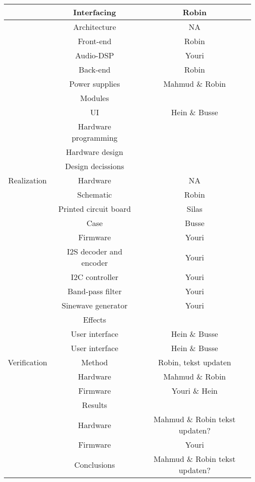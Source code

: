 \begin{justify}
\begin{table}[!h]
\begin{tabular}{|c|c|c|}
							& Interfacing					& Robin				\\ \hline
							& Architecture					& NA				\\ \hline
							& Front-end						& Robin				\\ \hline
							& Audio-DSP						& Youri				\\ \hline
							& Back-end						& Robin				\\ \hline
							& Power supplies				& Mahmud \& Robin	\\ \hline
							& Modules						& 					\\ \hline
							& UI							& Hein \& Busse		\\ \hline
							& Hardware programming			& 					\\ \hline
							& Hardware design				& 					\\ \hline
							& Design decissions				& 					\\ \hline
Realization					& Hardware						& NA				\\ \hline
							& Schematic						& Robin				\\ \hline
							& Printed circuit board			& Silas				\\ \hline
							& Case							& Busse				\\ \hline
							& Firmware						& Youri				\\ \hline
							& I2S decoder and encoder		& Youri				\\ \hline
							& I2C controller				& Youri				\\ \hline
							& Band-pass filter				& Youri				\\ \hline
							& Sinewave generator			& Youri				\\ \hline
							& Effects						& 					\\ \hline
							& User interface				& Hein \& Busse		\\ \hline
							& User interface				& Hein \& Busse		\\ \hline
Verification				& Method						& Robin, tekst updaten					\\ \hline
							& Hardware						& Mahmud \& Robin	\\ \hline
							& Firmware						& Youri \& Hein		\\ \hline
							& Results						& 					\\ \hline
							& Hardware						& Mahmud \& Robin tekst updaten?					\\ \hline
							& Firmware						& Youri					\\ \hline
							& Conclusions					& Mahmud \& Robin tekst updaten?					\\ \hline

\end{tabular}
\end{table}
\end{justify}
